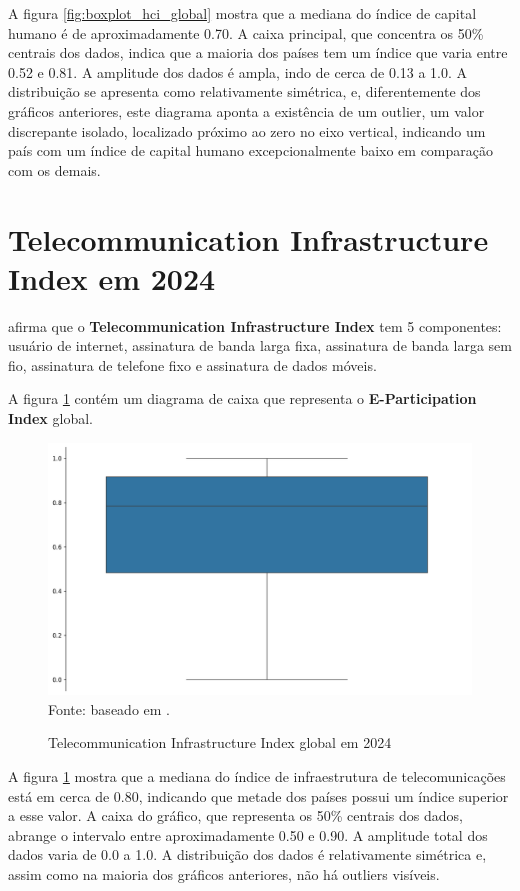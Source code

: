 A figura \ref{fig:boxplot_hci_global} mostra que a mediana do índice de capital humano é de aproximadamente 0.70. A caixa principal, que concentra os 50\% centrais dos dados, indica que a maioria dos países tem um índice que varia entre 0.52 e 0.81. A amplitude dos dados é ampla, indo de cerca de 0.13 a 1.0. A distribuição se apresenta como relativamente simétrica, e, diferentemente dos gráficos anteriores, este diagrama aponta a existência de um outlier, um valor discrepante isolado, localizado próximo ao zero no eixo vertical, indicando um país com um índice de capital humano excepcionalmente baixo em comparação com os demais.

\section{Telecommunication Infrastructure Index em 2024}
\label{tii}

\cite{ONU_EGDI_methodology} afirma que o \textbf{Telecommunication Infrastructure Index} tem 5 componentes: usuário de internet, assinatura de banda larga fixa, assinatura de banda larga sem fio, assinatura de telefone fixo e assinatura de dados móveis.

A figura \ref{fig:boxplot_tci_global} contém um diagrama de caixa que representa o \textbf{E-Participation Index} global.

\begin{figure}[H]
	\centering
	\caption{Telecommunication Infrastructure Index global em 2024}
	\includegraphics[width=1\linewidth]{figuras/egdi/boxplot_tci_global.png}
	\label{fig:boxplot_tci_global}
	\footnotesize{Fonte: baseado em \cite{ONU_EGDI_mapa}.}
\end{figure}

A figura \ref{fig:boxplot_tci_global} mostra que a mediana do índice de infraestrutura de telecomunicações está em cerca de 0.80, indicando que metade dos países possui um índice superior a esse valor. A caixa do gráfico, que representa os 50\% centrais dos dados, abrange o intervalo entre aproximadamente 0.50 e 0.90. A amplitude total dos dados varia de 0.0 a 1.0. A distribuição dos dados é relativamente simétrica e, assim como na maioria dos gráficos anteriores, não há outliers visíveis.

